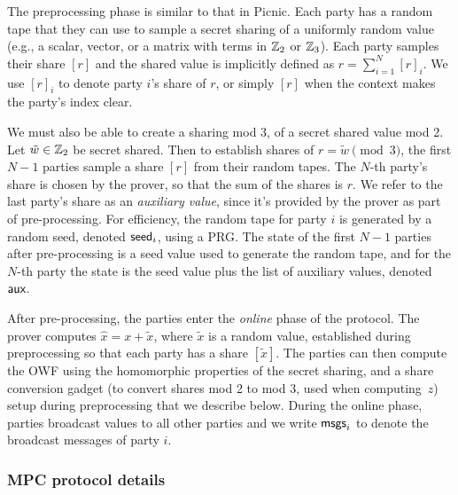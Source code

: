The preprocessing phase is similar to that in Picnic.  Each party has a random
tape that they can use to sample a secret sharing of a uniformly random value
(e.g.,  a scalar, vector, or a matrix with terms in $\mathbb{Z}_2$ or $\mathbb{Z}_3$).  Each
party samples their share $[r]$ and the shared value is implicitly defined as
$r = \sum_{i=1}^N [r]_i$.  We use $[r]_i$ to denote party $i$'s share of $r$,
or simply $[r]$ when the context makes the party's index clear.

We must also be able to create a sharing mod 3, of a secret shared value mod 2.
Let $\tilde{w}\in\mathbb{Z}_2$ be secret shared.  Then to establish shares of $r = \tilde{w} \pmod
3$, the first $N-1$ parties sample a share $[r]$ from their random tapes. The
$N$-th party's share is chosen by the prover, so that the sum of the shares is
$r$.  We refer to the last party's share as an \emph{auxiliary value}, since
it's provided by the prover as part of pre-processing.  For efficiency, the random
tape for  party $i$ is
generated by a random seed, denoted $\textsf{seed}_i$, using a PRG. The state of the first
$N-1$ parties after pre-processing is a seed value used to generate the random
tape, and for the $N$-th party the state is the seed value plus the list of
auxiliary values, denoted $\textsf{aux}$. 

After pre-processing, the parties enter the \emph{online} phase of the protocol. 
The prover computes $\hat{x}= x + \tilde{x}$, where $\tilde{x}$ is a random value, established during
preprocessing so that each party has a share $[\tilde{x}]$. 
The parties can then compute the OWF using the homomorphic properties of the secret sharing, 
and a share conversion gadget (to convert shares mod 2 to mod 3, used when computing~$z$)
setup during preprocessing that we describe below. 
During the online phase, parties broadcast values to all other parties and we write $\textsf{msgs}_i$
to denote the broadcast messages of party $i$. 

\subsubsection{MPC protocol details}

